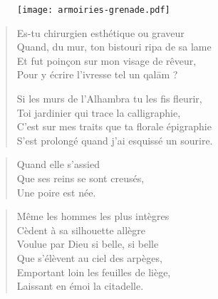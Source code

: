 \begin{figure}[h]
\centering
\texttt{[image: armoiries-grenade.pdf]}
\captionsetup{labelformat=empty}
\caption[Armoiries nasrides de Grenade, d’après un relief de l’Alhambra, dont l’écu se blasonne ainsi .]{}
\end{figure}

\begin{verse}
Es-tu chirurgien esthétique ou graveur\\
Quand, du mur, ton bistouri ripa de sa lame\\
Et fut poinçon sur mon visage de rêveur,\\
Pour y écrire l’ivresse tel un qalām ?

Si les murs de l’Alhambra tu les fis fleurir,\\
Toi jardinier qui trace la calligraphie,\\
C’est sur mes traits que ta florale épigraphie\\
S’est prolongé quand j’ai esquissé un sourire.
\end{verse}

\begin{verse}
Quand elle s’assied\\
Que ses  reins se sont creusés,\\
Une poire est née.
\end{verse}

\begin{verse}
Même les hommes les plus intègres\\
Cèdent à sa silhouette allègre\\
Voulue par Dieu si belle, si belle\\
Que s’élèvent au ciel des arpèges,\\
Emportant loin les feuilles de liège,\\
Laissant en émoi la citadelle.
\end{verse}


